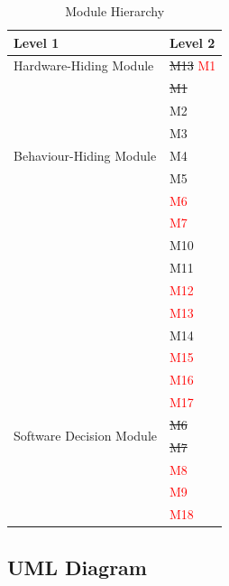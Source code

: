 \documentclass[12pt, titlepage]{article}
\begin{document}
\begin{table}[H]
\centering
\begin{tabular}{p{} p{}}
\toprule
\textbf{Level 1} & \textbf{Level 2}\\
\midrule

{Hardware-Hiding Module} & \sout{M13} \textcolor{red}{M1} \\
\midrule

\multirow{7}{0.3\textwidth}{Behaviour-Hiding Module}
& \sout{M1}\\
& M2\\
& M3\\
& M4\\
& M5\\
& \textcolor{red}{M6} \\
& \textcolor{red}{M7} \\
& M10\\
& M11\\
& \textcolor{red}{M12} \\
& \textcolor{red}{M13} \\
& M14\\
& \textcolor{red}{M15} \\
& \textcolor{red}{M16} \\
& \textcolor{red}{M17} \\
\midrule

\multirow{2}{0.3\textwidth}{Software Decision Module} 
& \sout{M6} \\  
& \sout{M7}\\
& \textcolor{red}{M8} \\
& \textcolor{red}{M9}\\
& \textcolor{red}{M18} \\
\bottomrule

\end{tabular}
\caption{Module Hierarchy}
\label{TblMH}
\end{table}



\subsection{UML Diagram}
\newpage
\end{document}
